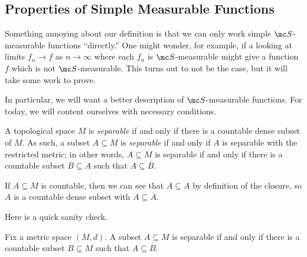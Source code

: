 \documentclass[../notes.tex]{subfiles}
\begin{document}
\subsection{Properties of Simple Measurable Functions}
Something annoying about our definition is that we can only work simple $\mc S$-measurable functions ``directly.'' One might wonder, for example, if a looking at limits $f_n\to f$ as $n\to\infty$ where each $f_n$ is $\mc S$-measurable might give a function $f$ which is not $\mc S$-measurable. This turns out to not be the case, but it will take some work to prove.

In particular, we will want a better description of $\mc S$-measurable functions. For today, we will content ourselves with necessary conditions.
\begin{definition}[Separable]
	A topological space $M$ is \textit{separable} if and only if there is a countable dense subset of $M$. As such, a subset $A\subseteq M$ is \textit{separable} if and only if $A$ is separable with the restricted metric; in other words, $A\subseteq M$ is separable if and only if there is a countable subset $B\subseteq A$ such that $A\subseteq\overline B$.
\end{definition}
\begin{example} \label{ex:countable-is-sep}
	If $A\subseteq M$ is countable, then we can see that $A\subseteq\overline A$ by definition of the closure, so $A$ is a countable dense subset with $A\subseteq\overline A$.
\end{example}
Here is a quick sanity check.
\begin{lemma} \label{lem:better-sep}
	Fix a metric space $(M,d)$. A subset $A\subseteq M$ is separable if and only if there is a countable subset $B\subseteq M$ such that $A\subseteq\overline B$.
\end{lemma}
\end{document}
